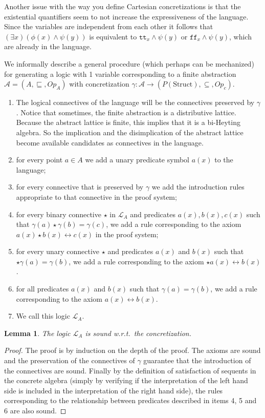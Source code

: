 \documentclass[11pt]{article}
\theoremstyle{plain}
\newtheorem{lem}[thm]{Lemma}
\theoremstyle{definition}
\begin{document}
Another issue with the way you define Cartesian concretizations is that the existential quantifiers seem to not increase the expressiveness of the language. Since the variables are independent from each other it follows that $(\exists x)(\phi(x)\land\psi(y))$ is equivalent to $\texttt{tt}_x\land\psi(y)$ or $\texttt{ff}_x\land\psi(y)$, which are already in the language.








We informally describe a general procedure (which perhaps can be mechanized) for generating a logic with 1 variable corresponding to a finite abstraction $\mathcal{A}=(A,\sqsubseteq, Op_A)$ with concretization $\gamma:\mathcal{A}\to (P(\text{Struct}),\subseteq, Op_c)$. 

\begin{enumerate}
	\item The logical connectives of the language will be the connectives preserved by $\gamma$. Notice that sometimes, the finite abstraction is a distributive lattice. Because the abstract lattice is finite, this implies that  it is a bi-Heyting algebra. So the implication and the disimplication of the abstract lattice become available candidates as connectives in the language.
	\item for every point $a\in A$ we add a unary predicate symbol $a(x)$ to the language; 
	\item for every connective that is preserved by $\gamma$ we add  the introduction rules appropriate to that connective in the proof system;
	\item for every binary connective  $\star$ in $\mathcal{L}_A$ and predicates $a(x),b(x),c(x)$ such that $\gamma(a)\star\gamma(b)=\gamma(c)$, we add a rule corresponding to the axiom $a(x)\star b(x)\leftrightarrow c(x)$ in the proof system;
	\item for every unary connective $\star$ and predicates $a(x)$ and $b(x)$ such that $\star\gamma(a)=\gamma(b)$, we add a rule corresponding to the axiom $\star a(x)\leftrightarrow b(x)$.
	\item for all predicates $a(x)$ and $b(x)$ such that $\gamma(a)=\gamma(b)$, we add a rule corresponding to the axiom $a(x)\leftrightarrow b(x)$.
	\item We call this logic $\mathcal{L}_A$.
\end{enumerate}

\begin{lem}
	The logic $\mathcal{L}_A$ is sound w.r.t.\ the concretization.
\end{lem}
\begin{proof}
	The proof is by induction on the depth of the proof. The axioms are sound and the preservation of the connectives of $\gamma$ guarantee that the introduction of the connectives are sound. Finally by the definition of satisfaction of sequents in the concrete algebra (simply by verifying if the interpretation of the left hand side is included in the interpretation of the right hand side), the rules corresponding to the relationship between predicates described in items 4, 5 and 6 are also sound.
\end{proof}
\end{document}
